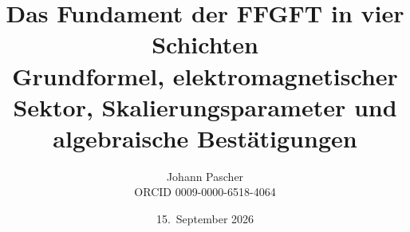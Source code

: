 \documentclass[11pt,a4paper]{report}
\title{Das Fundament der FFGFT in vier Schichten\\[0.5em]\large Grundformel, elektromagnetischer Sektor, Skalierungsparameter und algebraische Bestätigungen}
\date{15.~September 2026}
\author{Johann Pascher\\\small ORCID 0009-0000-6518-4064}
\begin{document}
\renewcommand{\thechapter}{}
\renewcommand{\thesection}{\arabic{section}}
\maketitle
\tableofcontents

\end{document}
